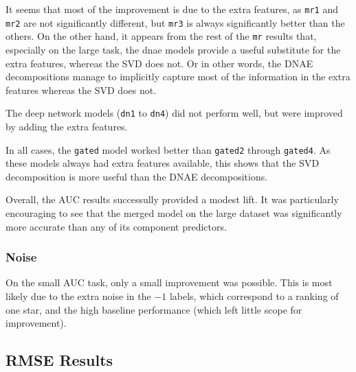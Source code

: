 \documentclass{article}
\begin{document}
It seems that most of the improvement is due to the extra features, as \texttt{mr1} and \texttt{mr2} are not significantly different, but \texttt{mr3} is always significantly better than the others.  On the other hand, it appears from the rest of the \texttt{mr} results that, especially on the large task, the dnae models provide a useful substitute for the extra features, whereas the SVD does not.  Or in other words, the DNAE decompositions manage to implicitly capture most of the information in the extra features whereas the SVD does not.

The deep network models (\texttt{dn1} to \texttt{dn4}) did not perform well, but were improved by adding the extra features.

In all cases, the \texttt{gated} model worked better than \texttt{gated2} through \texttt{gated4}.  As these models always had extra features available, this shows that the SVD decomposition is more useful than the DNAE decompositions.

Overall, the AUC results successully provided a modest lift.  It was particularly encouraging to see that the merged model on the large dataset was significantly more accurate than any of its component predictors.

\subsubsection{Noise}

On the small AUC task, only a small improvement was possible.  This is most likely due to the extra noise in the $-1$ labels, which correspond to a ranking of one star, and the high baseline performance (which left little scope for improvement).

\subsection{RMSE Results}

\end{document}
